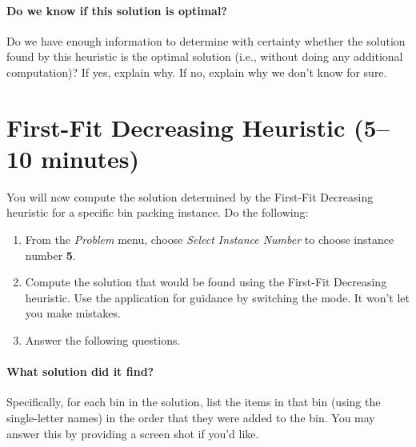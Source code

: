\documentclass[11pt,letterpaper]{article}
\begin{document}
\vspace*{0.25in}

\paragraph*{Do we know if this solution is optimal?} Do we have enough 
information to determine with certainty whether the solution found by
this heuristic is the optimal solution (i.e., without doing any additional
computation)? If yes, explain why. If no, explain why we don't know for sure.

\vspace*{1in}


\newpage

\section{First-Fit Decreasing Heuristic (5--10 minutes)}\label{sec:ffd}


You will now compute the solution determined by the First-Fit Decreasing
heuristic for a specific bin packing instance. Do the following:
\begin{enumerate}[leftmargin=*, parsep=0pt, itemsep=2pt, topsep=2pt]
\item From the {\em Problem} menu, choose {\em Select Instance Number}
to choose instance number \textbf{5}.
\item Compute the solution that would be found using the First-Fit Decreasing
heuristic. Use the application for guidance by switching the mode.
It won't let you make mistakes.
\item Answer the following questions.
\end{enumerate}

\paragraph*{What solution did it find?} Specifically, for each bin in the
solution, list the items in that bin (using the single-letter names) in the
order that they were added to the bin. You may answer this by providing a
screen shot if you'd like.
\end{document}

